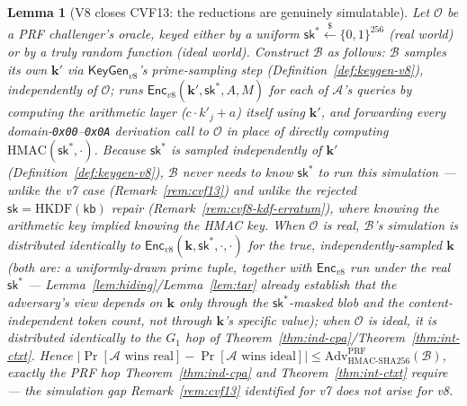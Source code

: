 \documentclass[11pt,a4paper]{article}
\newtheorem{lemma}[theorem]{Lemma}
\begin{document}
\begin{lemma}[V8 closes CVF13: the reductions are genuinely simulatable]
\label{lem:v8-cvf13}
Let $\mathcal{O}$ be a PRF challenger's oracle, keyed either by a uniform
$\mathsf{sk}^*\xleftarrow{\$}\{0,1\}^{256}$ (real world) or by a truly
random function (ideal world). Construct $\mathcal{B}$ as follows:
$\mathcal{B}$ samples its own $\mathbf{k}'$ via
$\mathsf{KeyGen}_{v8}$'s prime-sampling step (Definition~\ref{def:keygen-v8}),
independently of $\mathcal{O}$; runs $\mathsf{Enc}_{v8}(\mathbf{k}',
\mathsf{sk}^*, A, M)$ for each of $\mathcal{A}$'s queries by computing the
arithmetic layer ($c\cdot k'_j+a$) itself using $\mathbf{k}'$, and
forwarding every domain-\texttt{0x00}--\texttt{0x0A} derivation call to
$\mathcal{O}$ in place of directly computing $\mathrm{HMAC}(\mathsf{sk}^*,\cdot)$.
Because $\mathsf{sk}^*$ is sampled independently of $\mathbf{k}'$
(Definition~\ref{def:keygen-v8}), $\mathcal{B}$ never needs to know
$\mathsf{sk}^*$ to run this simulation --- unlike the v7 case
(Remark~\ref{rem:cvf13}) and unlike the rejected
$\mathsf{sk}=\mathrm{HKDF}(\mathsf{kb})$ repair
(Remark~\ref{rem:cvf8-kdf-erratum}), where knowing the arithmetic key
implied knowing the HMAC key. When $\mathcal{O}$ is real,
$\mathcal{B}$'s simulation is distributed identically to
$\mathsf{Enc}_{v8}(\mathbf{k}, \mathsf{sk}^*, \cdot, \cdot)$ for the true,
independently-sampled $\mathbf{k}$ (both are: a uniformly-drawn prime
tuple, together with $\mathsf{Enc}_{v8}$ run under the real $\mathsf{sk}^*$
--- Lemma~\ref{lem:hiding}/Lemma~\ref{lem:tar} already establish that the
adversary's view depends on $\mathbf{k}$ only through the
$\mathsf{sk}^*$-masked blob and the content-independent token \emph{count},
not through $\mathbf{k}$'s specific value); when $\mathcal{O}$ is ideal,
it is distributed identically to the $G_1$ hop of
Theorem~\ref{thm:ind-cpa}/Theorem~\ref{thm:int-ctxt}. Hence
$|\Pr[\mathcal{A}\text{ wins real}]-\Pr[\mathcal{A}\text{ wins ideal}]| \leq
\mathrm{Adv}^{\mathrm{PRF}}_{\mathrm{HMAC\text{-}SHA256}}(\mathcal{B})$,
exactly the PRF hop Theorem~\ref{thm:ind-cpa} and
Theorem~\ref{thm:int-ctxt} require --- the simulation gap Remark~\ref{rem:cvf13}
identified for v7 does not arise for v8.
\end{lemma}
\end{document}
